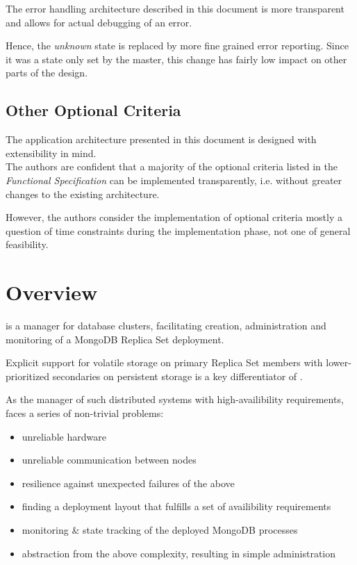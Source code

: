 The error handling architecture described in this document is more transparent and allows for actual debugging of an error.

Hence, the \emph{unknown} state is replaced by more fine grained error reporting.
Since it was a state only set by the master, this change has fairly low impact on other parts of the design.

\subsection{Other Optional Criteria}

The application architecture presented in this document is designed with extensibility in mind.\\
The authors are confident that a majority of the optional criteria listed in the \emph{Functional Specification} can be implemented
transparently, i.e. without greater changes to the existing architecture.

However, the authors consider the implementation of optional criteria mostly a question of time constraints during the
implementation phase, not one of general feasibility.

\section{Overview}

\mamid is a manager for database clusters, facilitating creation, administration and monitoring of a MongoDB Replica Set deployment.

Explicit support for volatile storage on primary Replica Set members with lower-prioritized secondaries on persistent
storage is a key differentiator of \mamid.

As the manager of such distributed systems with high-availibility requirements, \mamid faces a series of non-trivial problems:
\begin{itemize}
  \item unreliable hardware
  \item unreliable communication between nodes
  \item resilience against unexpected failures of the above 
  \item finding a deployment layout that fulfills a set of availibility requirements
  \item monitoring \& state tracking of the deployed MongoDB processes
  \item abstraction from the above complexity, resulting in simple administration
\end{itemize}

